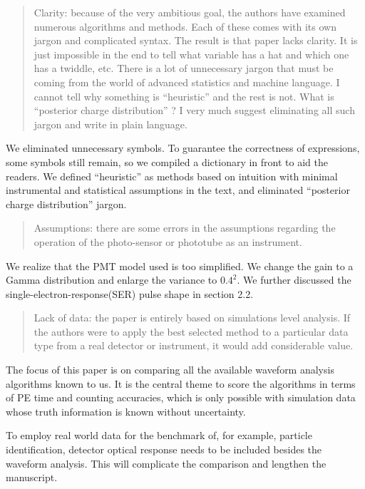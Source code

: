 \documentclass[12pt]{article}
\begin{document}
\begin{quote}
Clarity: because of the very ambitious goal, the authors have examined numerous algorithms and methods. Each of these comes with its own jargon and complicated syntax. The result is that paper lacks clarity. It is just impossible in the end to tell what variable has a hat and which one has a twiddle, etc. There is a lot of unnecessary jargon that must be coming from the world of advanced statistics and machine language. I cannot tell why something is ``heuristic'' and the rest is not. What is ``posterior charge distribution'' ? I very much suggest eliminating all such jargon and write in plain language.
\end{quote}

We eliminated unnecessary symbols. To guarantee the correctness of expressions, some symbols still remain, so we compiled a dictionary in front to aid the readers.  We defined ``heuristic'' as methods based on intuition with minimal instrumental and statistical assumptions in the text, and eliminated ``posterior charge distribution'' jargon.

\begin{quote}
Assumptions: there are some errors in the assumptions regarding the operation of the photo-sensor or phototube as an instrument.
\end{quote}

We realize that the PMT model used is too simplified. We change the gain to a Gamma distribution and enlarge the variance to $0.4^2$.  We further discussed the single-electron-response(SER) pulse shape in section 2.2. 

\begin{quote}
Lack of data: the paper is entirely based on simulations level analysis. If the authors were to apply the best selected method to a particular data type from a real detector or instrument, it would add considerable value.
\end{quote}

The focus of this paper is on comparing all the available waveform analysis algorithms known to us.  It is the central theme to score the algorithms in terms of PE time and counting accuracies, which is only possible with simulation data whose truth information is known without uncertainty.

To employ real world data for the benchmark of, for example, particle identification, detector optical response needs to be included besides the waveform analysis.  This will complicate the comparison and lengthen the manuscript.
\end{document}
